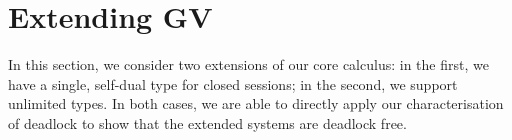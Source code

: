 \documentclass[oribibl,orivec,envcountsame]{llncs}
\begin{document}



\section{Extending GV}\label{sec:extend}

In this section, we consider two extensions of our core calculus: in the first, we have a single,
self-dual type for closed sessions; in the second, we support unlimited types.  In both cases, we
are able to directly apply our characterisation of deadlock to show that the extended systems are
deadlock free.
\end{document}
